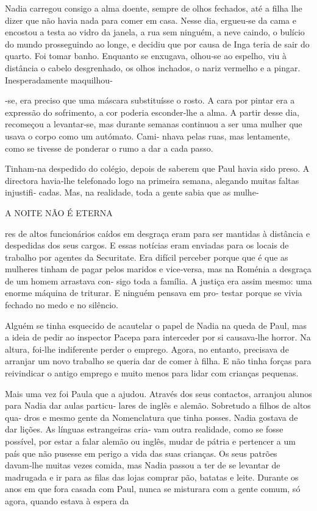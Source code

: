 Nadia carregou consigo a alma doente, sempre de olhos fechados, até a
filha lhe dizer que não havia nada para comer em casa. Nesse dia,
ergueu‑se da cama e encostou a testa ao vidro da janela, a rua sem
ninguém, a neve caindo, o bulício do mundo prosseguindo ao longe, e
decidiu que por causa de Inga teria de sair do quarto. Foi tomar banho.
Enquanto se enxugava, olhou‑se ao espelho, viu à distância o cabelo
desgrenhado, os olhos inchados, o nariz vermelho e a pingar.
Inesperadamente maquilhou‑

‑se, era preciso que uma máscara substituísse o rosto. A cara por pintar
era a expressão do sofrimento, a cor poderia esconder‑lhe a alma. A
partir desse dia, recomeçou a levantar‑se, mas durante semanas continuou
a ser uma mulher que usava o corpo como um autómato. Cami‑ nhava pelas
ruas, mas lentamente, como se tivesse de ponderar o rumo a dar a cada
passo.

Tinham‑na despedido do colégio, depois de saberem que Paul havia sido
preso. A directora havia‑lhe telefonado logo na primeira semana,
alegando muitas faltas injustifi‑ cadas. Mas, na realidade, toda a gente
sabia que as mulhe‑

A NOITE NÃO É ETERNA

res de altos funcionários caídos em desgraça eram para ser mantidas à
distância e despedidas dos seus cargos. E essas notícias eram enviadas
para os locais de trabalho por agentes da Securitate. Era difícil
perceber porque que é que as mulheres tinham de pagar pelos maridos e
vice‑versa, mas na Roménia a desgraça de um homem arrastava con‑ sigo
toda a família. A justiça era assim mesmo: uma enorme máquina de
triturar. E ninguém pensava em pro‑ testar porque se vivia fechado no
medo e no silêncio.

Alguém se tinha esquecido de acautelar o papel de Nadia na queda de
Paul, mas a ideia de pedir ao inspector Pacepa para interceder por si
causava‑lhe horror. Na altura, foi‑lhe indiferente perder o emprego.
Agora, no entanto, precisava de arranjar um novo trabalho se queria dar
de comer à filha. E não tinha forças para reivindicar o antigo emprego e
muito menos para lidar com crianças pequenas.

Mais uma vez foi Paula que a ajudou. Através dos seus contactos,
arranjou alunos para Nadia dar aulas particu‑ lares de inglês e alemão.
Sobretudo a filhos de altos qua‑ dros e mesmo gente da Nomenclatura que
tinha posses. Nadia gostava de dar lições. As línguas estrangeiras cria‑
vam outra realidade, como se fosse possível, por estar a falar alemão ou
inglês, mudar de pátria e pertencer a um país que não pusesse em perigo
a vida das suas crianças. Os seus patrões davam‑lhe muitas vezes comida,
mas Nadia passou a ter de se levantar de madrugada e ir para as filas
das lojas comprar pão, batatas e leite. Durante os anos em que fora
casada com Paul, nunca se misturara com a gente comum, só agora, quando
estava à espera da

